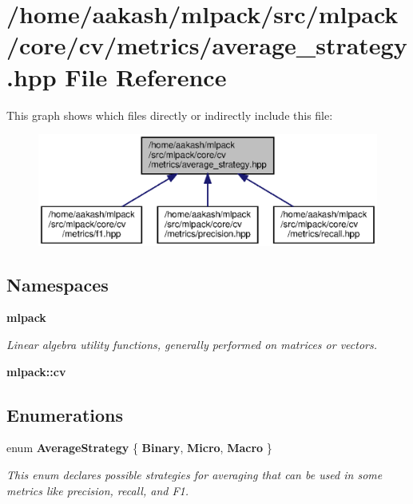 \section{/home/aakash/mlpack/src/mlpack/core/cv/metrics/average\+\_\+strategy.hpp File Reference}
\label{average__strategy_8hpp}
This graph shows which files directly or indirectly include this file\+:
\nopagebreak
\begin{figure}[H]
\begin{center}
\leavevmode
\includegraphics[width=350pt]{average__strategy_8hpp__dep__incl}
\end{center}
\end{figure}
\subsection*{Namespaces}
\begin{DoxyCompactItemize}
\item 
 \textbf{ mlpack}
\begin{DoxyCompactList}\small\item\em Linear algebra utility functions, generally performed on matrices or vectors. \end{DoxyCompactList}\item 
 \textbf{ mlpack\+::cv}
\end{DoxyCompactItemize}
\subsection*{Enumerations}
\begin{DoxyCompactItemize}
\item 
enum \textbf{ Average\+Strategy} \{ \newline
\textbf{ Binary}, 
\newline
\textbf{ Micro}, 
\newline
\textbf{ Macro}
 \}\begin{DoxyCompactList}\small\item\em This enum declares possible strategies for averaging that can be used in some metrics like precision, recall, and F1. \end{DoxyCompactList}
\end{DoxyCompactItemize}


